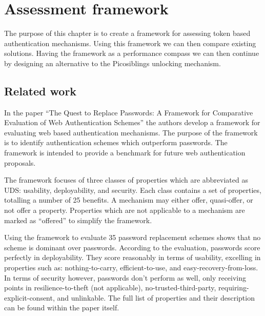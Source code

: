 
\chapter{Assessment framework}

\label{Chapter3}


The purpose of this chapter is to create a framework for assessing token based authentication mechanisms. Using this framework we can then compare existing solutions. Having the framework as a performance compass we can then continue by designing an alternative to the Picosiblings unlocking mechanism.

\section{Related work}


In the paper ``The Quest to Replace Passwords: A Framework for Comparative Evaluation of Web Authentication Schemes'' \cite{bonneau2012quest} the authors develop a framework for evaluating web based authentication mechanisms. The purpose of the framework is to identify authentication schemes which outperform passwords. The framework is intended to provide a benchmark for future web authentication proposals.

The framework focuses of three classes of properties which are abbreviated as UDS: usability, deployability, and security. Each class contains a set of properties, totalling a number of 25 benefits. A mechanism may either offer, quasi-offer, or not offer a property. Properties which are not applicable to a mechanism are marked as ``offered'' to simplify the framework.

Using the framework to evaluate 35 password replacement schemes shows that no scheme is dominant over passwords. According to the evaluation, passwords score perfectly in deployability. They score reasonably in terms of usability, excelling in properties such as: nothing-to-carry, efficient-to-use, and easy-recovery-from-loss. In terms of security however, passwords don't perform as well, only receiving points in resilience-to-theft (not applicable), no-trusted-third-party, requiring-explicit-consent, and unlinkable. The full list of properties and their description can be found within the paper itself.

